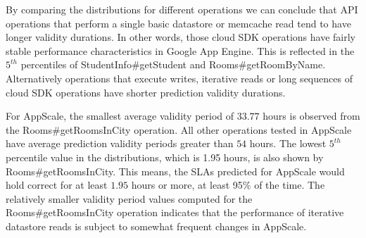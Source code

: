 By comparing the distributions for different operations we can conclude that
API operations that perform a single basic datastore or memcache read tend to
have longer validity durations. In other words, those cloud SDK operations have
fairly stable performance characteristics in Google App Engine. 
This is reflected in
the $5^{th}$ percentiles of StudentInfo\#getStudent and Rooms\#getRoomByName. 
Alternatively
operations that execute writes, iterative reads or long sequences of cloud SDK
operations have shorter prediction validity durations.

For AppScale, 
the smallest average validity period of $33.77$ hours is observed from the
Rooms\#getRoomsInCity operation. All other operations tested in 
AppScale have average prediction validity periods greater
than $54$ hours. The lowest $5^{th}$ percentile value in the 
distributions, which is 1.95 hours, is 
also shown by Rooms\#getRoomsInCity. This means, the SLAs predicted for
AppScale would hold correct for at least $1.95$ hours or more, 
at least 95\% of the time.
The relatively smaller validity period values computed for the
Rooms\#getRoomsInCity operation indicates that the performance of iterative datastore reads is subject to somewhat frequent changes 
in AppScale.

%

